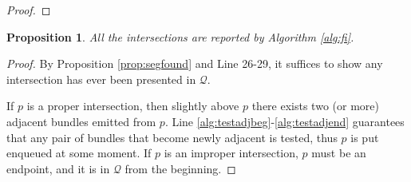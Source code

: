 \documentclass[a4paper]{article}
\newtheorem{prop}{Proposition}
\begin{document}
\begin{proof}

\end{proof}

\begin{prop}
  All the intersections are reported by Algorithm \ref{alg:fi}.
\end{prop}
\begin{proof}
  By Proposition \ref{prop:segfound} and Line 26-29,
  it suffices to show any intersection has ever been presented in $\mathcal{Q}$.
  
  If $p$ is a proper intersection,
  then slightly above $p$ there exists two (or more) adjacent bundles emitted from $p$.
  Line \ref{alg:testadjbeg}-\ref{alg:testadjend} guarantees that any pair of bundles that become newly adjacent is tested,
  thus $p$ is put enqueued at some moment.
  If $p$ is an improper intersection, $p$ must be an endpoint,
  and it is in $\mathcal{Q}$ from the beginning.
  
\end{proof}

\end{document}
